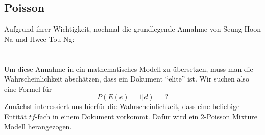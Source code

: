 \subsection{Poisson}
Aufgrund ihrer Wichtigkeit, nochmal die grundlegende Annahme von Seung-Hoon Na und Hwee Tou Ng:\\
\\
\\
Um diese Annahme in ein mathematisches Modell zu übersetzen, muss man die Wahrscheinlichkeit abschätzen, dass ein Dokument ``elite'' ist. Wir suchen also eine Formel für
\[P\left( E\left( e \right)=1|d \right)=\ ?\]
Zunächst interessiert uns hierfür die Wahrscheinlichkeit, dass eine beliebige Entität $tf$-fach in einem Dokument vorkommt. Dafür wird ein 2-Poisson Mixture Modell herangezogen.


